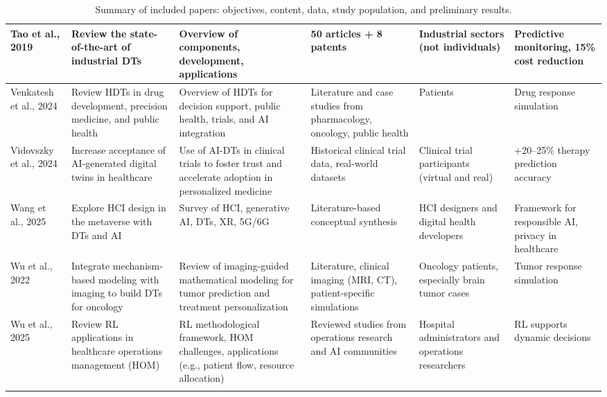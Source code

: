 \documentclass[10pt,a4paper]{article}
\begin{document}
\begin{small}
\begin{longtable}{|p{2cm}|p{2.8cm}|p{2.8cm}|p{2cm}|p{2cm}|p{3.2cm}|}
Tao et al., 2019 & Review the state-of-the-art of industrial DTs & Overview of components, development, applications & 50 articles + 8 patents & Industrial sectors (not individuals) & Predictive monitoring, 15\% cost reduction \\
\hline
Venkatesh et al., 2024 & Review HDTs in drug development, precision medicine, and public health & Overview of HDTs for decision support, public health, trials, and AI integration & Literature and case studies from pharmacology, oncology, public health & Patients & Drug response simulation \\
\hline
Vidovszky et al., 2024 & Increase acceptance of AI-generated digital twins in healthcare & Use of AI-DTs in clinical trials to foster trust and accelerate adoption in personalized medicine & Historical clinical trial data, real-world datasets & Clinical trial participants (virtual and real) & +20–25\% therapy prediction accuracy \\
\hline
Wang et al., 2025 & Explore HCI design in the metaverse with DTs and AI & Survey of HCI, generative AI, DTs, XR, 5G/6G & Literature-based conceptual synthesis & HCI designers and digital health developers & Framework for responsible AI, privacy in healthcare \\
\hline

Wu et al., 2022 & Integrate mechanism-based modeling with imaging to build DTs for oncology & Review of imaging-guided mathematical modeling for tumor prediction and treatment personalization & Literature, clinical imaging (MRI, CT), patient-specific simulations & Oncology patients, especially brain tumor cases & Tumor response simulation \\
\hline

Wu et al., 2025 & Review RL applications in healthcare operations management (HOM) & RL methodological framework, HOM challenges, applications (e.g., patient flow, resource allocation) & Reviewed studies from operations research and AI communities & Hospital administrators and operations researchers & RL supports dynamic decisions \\
\hline

\caption{Summary of included papers: objectives, content, data, study population, and preliminary results.}
\label{tabella1}
\end{longtable}
\end{small}
\end{document}
